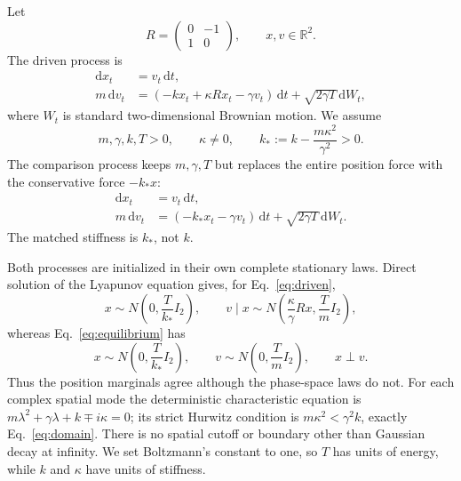 \documentclass[aps,pre,reprint,amsmath,amssymb,superscriptaddress,nofootinbib]{revtex4-2}
\newcommand{\RR}{\mathbb{R}}
\newcommand{\dd}{\mathrm{d}}
\begin{document}
Let
\begin{equation}
 R=\begin{pmatrix}0&-1\\1&0\end{pmatrix},
 \qquad x,v\in\RR^2.
\end{equation}
The driven process is
\begin{subequations}
\label{eq:driven}
\begin{align}
 \dd x_t &=v_t\,\dd t,\\
 m\,\dd v_t&=(-k x_t+\kappa R x_t-\gamma v_t)\,\dd t
       +\sqrt{2\gamma T}\,\dd W_t,
\end{align}
\end{subequations}
where $W_t$ is standard two-dimensional Brownian motion.  We assume
\begin{equation}
 m,\gamma,k,T>0,\qquad \kappa\ne0,\qquad
 k_*:=k-\frac{m\kappa^2}{\gamma^2}>0.
\label{eq:domain}
\end{equation}
The comparison process keeps $m,\gamma,T$ but replaces the entire position
force with the conservative force $-k_*x$:
\begin{subequations}
\label{eq:equilibrium}
\begin{align}
 \dd x_t &=v_t\,\dd t,\\
 m\,\dd v_t&=(-k_* x_t-\gamma v_t)\,\dd t
       +\sqrt{2\gamma T}\,\dd W_t.
\end{align}
\end{subequations}
The matched stiffness is $k_*$, not $k$.

Both processes are initialized in their own complete stationary laws.  Direct
solution of the Lyapunov equation gives, for Eq.~\eqref{eq:driven},
\begin{equation}
 x\sim N\!\left(0,\frac{T}{k_*}I_2\right),\qquad
 v\mid x\sim N\!\left(\frac{\kappa}{\gamma}Rx,
                       \frac{T}{m}I_2\right),
\label{eq:stationary-driven}
\end{equation}
whereas Eq.~\eqref{eq:equilibrium} has
\begin{equation}
 x\sim N\!\left(0,\frac{T}{k_*}I_2\right),\qquad
 v\sim N\!\left(0,\frac{T}{m}I_2\right),\qquad x\perp v.
\label{eq:stationary-equilibrium}
\end{equation}
Thus the position marginals agree although the phase-space laws do not.  For
each complex spatial mode the deterministic characteristic equation is
$m\lambda^2+\gamma\lambda+k\mp i\kappa=0$; its strict Hurwitz condition is
$m\kappa^2<\gamma^2k$, exactly Eq.~\eqref{eq:domain}.  There is no spatial
cutoff or boundary other than Gaussian decay at infinity.  We set Boltzmann's
constant to one, so $T$ has units of energy, while $k$ and $\kappa$ have
units of stiffness.
\end{document}
